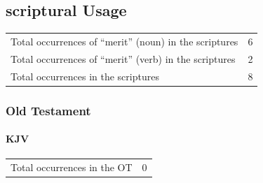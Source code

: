 
	


\subsection{scriptural Usage} %
	\label{MERIT-sCRIPTUREs}
	
	\begin{tabular}{ll}
		Total occurrences of ``merit'' (noun) in the scriptures & 6 \\
		Total occurrences of ``merit'' (verb) in the scriptures & 2 \\
		Total occurrences in the scriptures & 8 \\
	\end{tabular}

	\subsubsection{Old Testament} %
		\label{MERIT-OT}
	
		\paragraph{KJV}
			\label{MERIT-OT-KJV}
	
			\begin{tabular}{ll}
				Total occurrences in the OT & 0
			\end{tabular}
			
